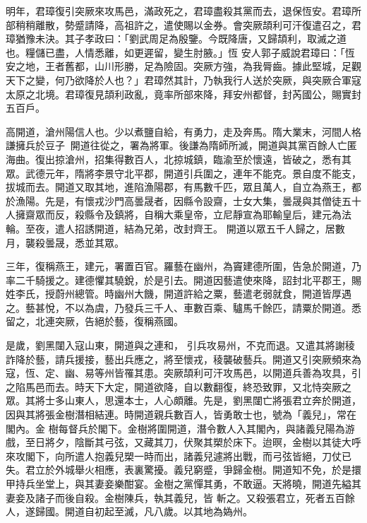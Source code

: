 \begin{pinyinscope}
 明年，君璋復引突厥來攻馬邑，滿政死之，君璋盡殺其黨而去，退保恆安。君璋所部稍稍離散，勢蹙請降，高祖許之，遣使賜以金券。會突厥頡利可汗復遣召之，君璋猶豫未決。其子孝政曰：「劉武周足為殷鑒。今既降唐，又歸頡利，取滅之道也。糧儲已盡，人情悉離，如更遲留，變生肘腋。」恆
 安人郭子威說君璋曰：「恆安之地，王者舊都，山川形勝，足為險固。突厥方強，為我脣齒。據此堅城，足觀天下之變，何乃欲降於人也？」君璋然其計，乃執我行人送於突厥，與突厥合軍寇太原之北境。君璋復見頡利政亂，竟率所部來降，拜安州都督，封芮國公，賜實封五百戶。



 高開道，滄州陽信人也。少以煮鹽自給，有勇力，走及奔馬。隋大業末，河間人格謙擁兵於豆子，開道往從之，署為將軍。後謙為隋師所滅，開道與其黨百餘人亡匿
 海曲。復出掠滄州，招集得數百人，北掠城鎮，臨渝至於懷遠，皆破之，悉有其眾。武德元年，隋將李景守北平郡，開道引兵圍之，連年不能克。景自度不能支，拔城而去。開道又取其地，進陷漁陽郡，有馬數千匹，眾且萬人，自立為燕王，都於漁陽。先是，有懷戎沙門高曇晟者，因縣令設齋，士女大集，曇晟與其僧徒五十人擁齋眾而反，殺縣令及鎮將，自稱大乘皇帝，立尼靜宣為耶輸皇后，建元為法輪。至夜，遣人招誘開道，結為兄弟，改封齊王。
 開道以眾五千人歸之，居數月，襲殺曇晟，悉並其眾。



 三年，復稱燕王，建元，署置百官。羅藝在幽州，為竇建德所圍，告急於開道，乃率二千騎援之。建德懼其驍銳，於是引去。開道因藝遣使來降，詔封北平郡王，賜姓李氏，授蔚州總管。時幽州大饑，開道許給之粟，藝遣老弱就食，開道皆厚遇之。藝甚悅，不以為虞，乃發兵三千人、車數百乘、驢馬千餘匹，請粟於開道。悉留之，北連突厥，告絕於藝，復稱燕國。



 是歲，劉黑闥入寇山東，開道與之連和，
 引兵攻易州，不克而退。又遣其將謝稜詐降於藝，請兵援接，藝出兵應之，將至懷戎，稜襲破藝兵。開道又引突厥頻來為寇，恆、定、幽、易等州皆罹其患。突厥頡利可汗攻馬邑，以開道兵善為攻具，引之陷馬邑而去。時天下大定，開道欲降，自以數翻復，終恐致罪，又北恃突厥之眾。其將士多山東人，思還本士，人心頗離。先是，劉黑闥亡將張君立奔於開道，因與其將張金樹潛相結連。時開道親兵數百人，皆勇敢士也，號為「義兒」，常在閣內。金
 樹每督兵於閣下。金樹將圍開道，潛令數人入其閣內，與諸義兒陽為游戲，至日將夕，陰斷其弓弦，又藏其刀，伏聚其槊於床下。迨暝，金樹以其徒大呼來攻閣下，向所遣人抱義兒槊一時而出，諸義兒遽將出戰，而弓弦皆絕，刀仗已失。君立於外城舉火相應，表裏驚擾。義兒窮蹙，爭歸金樹。開道知不免，於是擐甲持兵坐堂上，與其妻妾樂酣宴。金樹之黨憚其勇，不敢逼。天將曉，開道先縊其妻妾及諸子而後自殺。金樹陳兵，執其義兒，皆
 斬之。又殺張君立，死者五百餘人，遂歸國。開道自初起至滅，凡八歲。以其地為媯州。




\end{pinyinscope}
